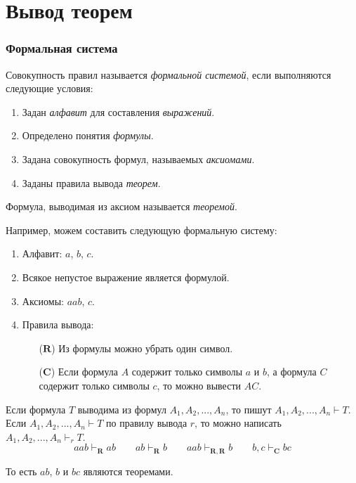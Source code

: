 \part{Вывод теорем}

\section{Формальная система}

Совокупность правил называется {\it формальной системой}, если выполняются следующие
условия:
\begin{enumerate}
	\item{}Задан {\it алфавит} для составления {\it выражений}.
	\item{}Определено понятия {\it формулы}.
	\item{}Задана совокупность формул, называемых {\it аксиомами}.
	\item{}Заданы правила вывода {\it теорем}.
\end{enumerate}

Формула, выводимая из аксиом называется {\it теоремой}.

\newcommand\ruleR{\mathbf{R}}
\newcommand\ruleC{\mathbf{C}}

Например, можем составить следующую формальную систему:
\begin{enumerate}
	\item{}Алфавит: $a$, $b$, $c$.
	\item{}Всякое непустое выражение является формулой.
	\item{}Аксиомы: $aab$, $c$.
	\item{}Правила вывода:
	\begin{enumerate}
		\item[($\ruleR$)]{}Из формулы можно убрать один символ.
		\item[($\ruleC$)]{}Если формула $A$ содержит только символы $a$ и $b$,
		а формула $C$ содержит только символы $c$, то можно
		вывести $AC$.
	\end{enumerate}
\end{enumerate}

Если формула $T$ выводима из формул $A_1,A_2,...,A_{n}$, то пишут
$A_1,A_2,...,A_{n}\vdash T$. Если $A_1,A_2,...,A_{n}\vdash T$ по правилу вывода $r$,
то можно написать $A_1,A_2,...,A_{n}\vdash_{r} T$.
\[
	aab\vdash_{\ruleR} ab\qquad
	ab\vdash_{\ruleR} b\qquad
	aab\vdash_{\ruleR,\ruleR} b\qquad
	b,c\vdash_{\ruleC}bc
\]

То есть $ab$, $b$ и $bc$ являются теоремами.

